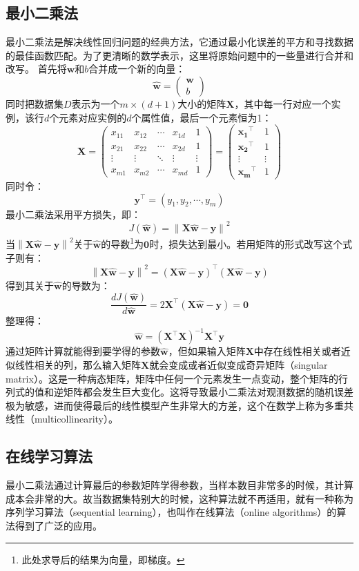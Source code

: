 \documentclass[12pt,a4paper,draft]{ctexart}
\begin{document}
\subsection{最小二乘法}
最小二乘法是解决线性回归问题的经典方法，它通过最小化误差的平方和寻找数据的最佳函数匹配。为了更清晰的数学表示，这里将原始问题中的一些量进行合并和改写。
首先将$ \bm{w} $和$ b $合并成一个新的向量：
\[ \hat{\bm{w}}=\begin{pmatrix}
\bm{w} \\ 
b
\end{pmatrix}  \]
同时把数据集$ D $表示为一个$ m\times(d+1) $大小的矩阵$ \bm{X} $，其中每一行对应一个实例，该行$ d $个元素对应实例的$ d $个属性值，最后一个元素恒为1：
\[ 
\bm{X}=
\begin{pmatrix}
	x_{11} & x_{12} & \cdots & x_{1d} & 1 \\ 
	x_{21} & x_{22} & \cdots & x_{2d} & 1 \\ 
	\vdots & \vdots & \ddots & \vdots & \vdots \\ 
	x_{m1} & x_{m2} & \cdots & x_{md} & 1
\end{pmatrix} =\begin{pmatrix}
\bm{x_1}^\top & 1 \\ 
\bm{x_2}^\top & 1 \\ 
\vdots & \vdots \\ 
\bm{x_m}^\top & 1
\end{pmatrix} 
\]
同时令：
\[ \bm{y}^\top=(y_1,y_2,\cdots,y_m) \]
最小二乘法采用平方损失，即： 
\[ J(\bm{\hat{w}})=\left \| \bm{X}\bm{\hat{w}}-\bm{y} \right \|^{2} \]
当$ \left \| \bm{X}\bm{\hat{w}}-\bm{y} \right \|^{2} $关于$ \hat{\bm{w}} $的导数\footnote{此处求导后的结果为向量，即梯度。}为$ \bm{0} $时，损失达到最小。若用矩阵的形式改写这个式子则有： 
\[ \left \| \bm{X}\bm{\hat{w}}-\bm{y} \right \|^{2}=(\bm{X}\bm{\hat{w}}-\bm{y})^\top(\bm{X}\bm{\hat{w}}-\bm{y}) \]
得到其关于$ \bm{\hat{w}} $的导数为： 
\[ \frac{dJ(\bm{\hat{w}})}{d\bm{\hat{w}}}=2\bm{X}^\top(\bm{X}\hat{\bm{w}}-\bm{y})=\bm{0} \]
整理得： 
\[ \hat{\bm{w}}=(\bm{X}^\top\bm{X})^{-1}\bm{X}^\top\bm{y} \]
通过矩阵计算就能得到要学得的参数$ \bm{\hat{w}} $，但如果输入矩阵$ \bm{X} $中存在线性相关或者近似线性相关的列，那么输入矩阵$ \bm{X} $就会变成或者近似变成奇异矩阵（singular matrix）。这是一种病态矩阵，矩阵中任何一个元素发生一点变动，整个矩阵的行列式的值和逆矩阵都会发生巨大变化。这将导致最小二乘法对观测数据的随机误差极为敏感，进而使得最后的线性模型产生非常大的方差，这个在数学上称为多重共线性（multicollinearity）。
\subsection{在线学习算法}
最小二乘法通过计算最后的参数矩阵学得参数，当样本数目非常多的时候，其计算成本会非常的大。故当数据集特别大的时候，这种算法就不再适用，就有一种称为序列学习算法（sequential learning），也叫作在线算法（online algorithms）的算法得到了广泛的应用。
\end{document}
